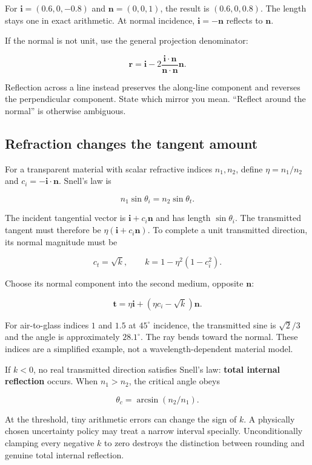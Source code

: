 For \(\mathbf i=(0.6,0,-0.8)\) and \(\mathbf n=(0,0,1)\), the result is \((0.6,0,0.8)\). The length stays one in exact arithmetic. At normal incidence, \(\mathbf i=-\mathbf n\) reflects to \(\mathbf n\).

If the normal is not unit, use the general projection denominator:

\[
\mathbf r=\mathbf i-2\frac{\mathbf i\cdot\mathbf n}{\mathbf n\cdot\mathbf n}\mathbf n.
\]

Reflection across a line instead preserves the along-line component and reverses the perpendicular component. State which mirror you mean. ``Reflect around the normal'' is otherwise ambiguous.

\subsection{Refraction changes the tangent amount}\label{01-foundations-i-ch018-refraction-changes-the-tangent-amount}

For a transparent material with scalar refractive indices \(n_1,n_2\), define \(\eta=n_1/n_2\) and \(c_i=-\mathbf i\cdot\mathbf n\). Snell's law is

\[
n_1\sin\theta_i=n_2\sin\theta_t.
\]

The incident tangential vector is \(\mathbf i+c_i\mathbf n\) and has length \(\sin\theta_i\). The transmitted tangent must therefore be \(\eta(\mathbf i+c_i\mathbf n)\). To complete a unit transmitted direction, its normal magnitude must be

\[
c_t=\sqrt{k},\qquad k=1-\eta^2(1-c_i^2).
\]

Choose its normal component into the second medium, opposite \(\mathbf n\):

\[
\mathbf t=\eta\mathbf i+(\eta c_i-\sqrt{k})\mathbf n.
\]

For air-to-glass indices \(1\) and \(1.5\) at \(45^\circ\) incidence, the transmitted sine is \(\sqrt2/3\) and the angle is approximately \(28.1^\circ\). The ray bends toward the normal. These indices are a simplified example, not a wavelength-dependent material model.

If \(k<0\), no real transmitted direction satisfies Snell's law: \textbf{total internal reflection} occurs. When \(n_1>n_2\), the critical angle obeys

\[
\theta_c=\arcsin(n_2/n_1).
\]

At the threshold, tiny arithmetic errors can change the sign of \(k\). A physically chosen uncertainty policy may treat a narrow interval specially. Unconditionally clamping every negative \(k\) to zero destroys the distinction between rounding and genuine total internal reflection.

